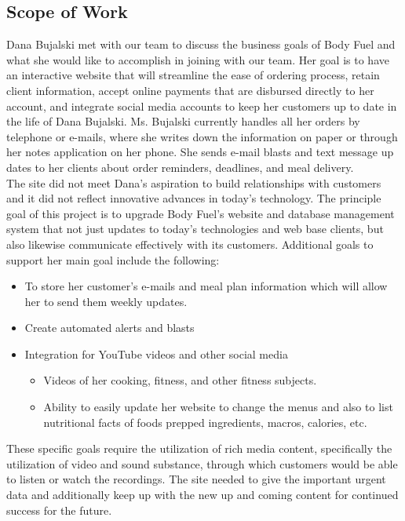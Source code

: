 \documentclass[letterpaper,11pt,2p]{elsarticle}
\begin{document}
\subsection{ Scope of Work}%
\label{subsec1}%

Dana Bujalski met with our team to discuss the business goals of Body Fuel and what she would like to accomplish in joining with our team. Her goal is to have an interactive website that will streamline the ease of ordering process, retain client information, accept online payments that are disbursed directly to her account, and integrate social media accounts to keep her customers up to date in the life of Dana Bujalski. Ms. Bujalski currently handles all her orders by telephone or e-mails, where she writes down the information on paper or through her notes application on her phone.  She sends e-mail blasts and text message up dates to her clients about order reminders, deadlines, and meal delivery.\\

The site did not meet Dana’s aspiration to build relationships with customers and it did not reflect innovative advances in today's technology. The principle goal of this project is to upgrade Body Fuel’s website and database management system that not just updates to today's technologies and web base clients, but also likewise communicate effectively with its customers. Additional goals to support her main goal include the following:

\begin{itemize}
    \item To store her customer’s e-mails and meal plan information which will allow her to send them weekly updates.
    \item Create automated alerts and blasts
    \item Integration for YouTube videos and other social media
    \begin{itemize}
        \item Videos of her cooking, fitness, and other fitness subjects.
        \item Ability to easily update her website to change the menus and also to list nutritional facts of foods prepped ingredients, macros, calories, etc.
    \end{itemize}
\end{itemize}

These specific goals require the utilization of rich media content, specifically the utilization of video and sound substance, through which customers would be able to listen or watch the recordings. The site needed to give the important urgent data and additionally keep up with the new up and coming content for continued success for the future. 
\end{document}
